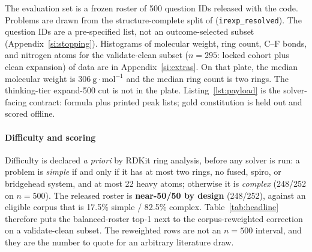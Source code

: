 \documentclass{article}
\begin{document}
The evaluation set is a frozen roster of 500 question IDs released with
the code.
Problems are drawn from the structure-complete split of \citep{yabbarov2026irexp}
(\texttt{irexp\_resolved}).
The question IDs are a pre-specified list, not an outcome-selected subset
(Appendix~\ref{si:stopping}).
Histograms of molecular weight, ring count, C--F bonds, and nitrogen
atoms for the validate-clean subset ($n{=}295$: locked cohort plus
clean expansion) of \citep{yabbarov2026irexp} data are in Appendix~\ref{si:extras}.
On that plate, the median molecular weight is $306~\mathrm{g{\cdot}mol^{-1}}$ and the median ring
count is two rings.
The thinking-tier expand-500 cut is not in the plate.
Listing~\ref{lst:payload} is the solver-facing contract: formula plus
printed peak lists; gold constitution is held out and scored offline.

\paragraph{Difficulty and scoring}
Difficulty is declared \emph{a priori} by RDKit ring analysis, before any
solver is run: a problem is \emph{simple} if and only if it has at most
two rings, no fused, spiro, or bridgehead system, and at most 22 heavy
atoms; otherwise it is \emph{complex} (248/252 on $n{=}500$).
The released roster is \textbf{near-50/50 by design} (248/252), against an
eligible corpus that is 17.5\% simple / 82.5\% complex.
Table~\ref{tab:headline} therefore puts the balanced-roster top-1 next to
the corpus-reweighted correction on a validate-clean subset.
The reweighted rows are not an $n{=}500$ interval, and they are the number
to quote for an arbitrary literature draw.
\end{document}
